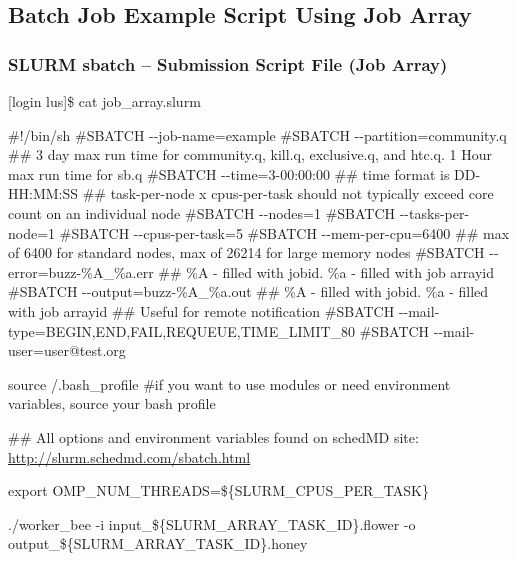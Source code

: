 \documentclass[t,hyperref={pdfpagelabels=false}]{beamer}
\newcommand{\ctilde}{{\fontfamily{ptm}\selectfont\texttildelow}}
\newcommand{\ddash}{-{}-}
\begin{document}
\subsection{Batch Job Example Script Using Job Array}
\begin{frame}[fragile]
\frametitle{SLURM sbatch -- Submission Script File (Job Array)}
\begin{semiverbatim}\tiny
[login lus]\$ cat job_array.slurm

\#!/bin/sh
\#SBATCH \ddash{}job-name=example
\#SBATCH \ddash{}partition=community.q
\#\# 3 day max run time for community.q, kill.q, exclusive.q, and htc.q.  1 Hour max run time for sb.q
\#SBATCH \ddash{}time=3-00:00:00 ## time format is DD-HH:MM:SS
\#\# task-per-node x cpus-per-task should not typically exceed core count on an individual node 
\#SBATCH \ddash{}nodes=1
\#SBATCH \ddash{}tasks-per-node=1
\#SBATCH \ddash{}cpus-per-task=5
\#SBATCH \ddash{}mem-per-cpu=6400 \#\# max of 6400 for standard nodes, max of 26214 for large memory nodes                                                                                                                                               
\#SBATCH \ddash{}error=buzz-\%A\_\%a.err \#\# \%A - filled with jobid. \%a - filled with job arrayid
\#SBATCH \ddash{}output=buzz-\%A\_\%a.out \#\# \%A - filled with jobid. \%a - filled with job arrayid
\#\# Useful for remote notification
\#SBATCH \ddash{}mail-type=BEGIN,END,FAIL,REQUEUE,TIME\_LIMIT\_80
\#SBATCH \ddash{}mail-user=user@test.org

source \ctilde/.bash_profile \#if you want to use modules or need environment variables, source your bash profile

\#\# All options and environment variables found on schedMD site: \href{http://slurm.schedmd.com/sbatch.html}{http://slurm.schedmd.com/sbatch.html}

export OMP\_NUM\_THREADS=\$\{SLURM\_CPUS\_PER\_TASK\}

./worker\_bee -i input\_\$\{SLURM_ARRAY_TASK_ID\}.flower -o output\_\$\{SLURM_ARRAY_TASK_ID\}.honey
\end{semiverbatim}
\end{frame}
\end{document}

